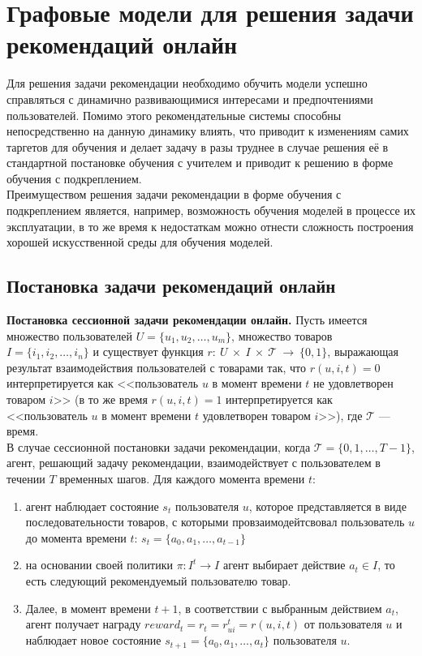 \documentclass[a4paper,14pt,oneside]{mipt-thesis-ms}
\begin{document}
\chapter{Графовые модели для решения задачи рекомендаций онлайн}
Для решения задачи рекомендации необходимо обучить модели успешно справляться с динамично развивающимися интересами и предпочтениями пользователей. Помимо этого рекомендательные системы способны непосредственно на данную динамику влиять, что приводит к изменениям самих таргетов для обучения и делает задачу в разы труднее в случае решения её в стандартной постановке обучения с учителем и приводит к решению в форме обучения с подкреплением.\\

Преимуществом решения задачи рекомендации в форме обучения с подкреплением является, например, возможность обучения моделей в процессе их эксплуатации, в то же время к недостаткам можно отнести сложность построения хорошей искусственной среды для обучения моделей.

\section{Постановка задачи рекомендаций онлайн}
{\bf Постановка сессионной задачи рекомендации онлайн.} Пусть имеется множество пользователей $U = \{u_1, u_2, \dots, u_m\}$, множество товаров $I = \{i_1, i_2, \dots, i_n\}$ и существует функция $r:~U~\times~I~\times~\mathcal{T}~\rightarrow~\{0,  1\}$, выражающая результат взаимодействия пользователей с товарами так, что $r(u, i, t) = 0$ интерпретируется как <<пользователь $u$ в момент времени $t$ не удовлетворен товаром $i$>> (в то же время $r(u, i, t) = 1$ интерпретируется как <<пользователь $u$ в момент времени $t$ удовлетворен товаром $i$>>), где $\mathcal{T}$ --- время\cite{chen03}.\\
В случае сессионной постановки задачи рекомендации\cite{lei01}, когда $\mathcal{T} = \{0, 1, \dots, T - 1\}$, агент, решающий задачу рекомендации, взаимодействует с пользователем в течении $T$ временных шагов. Для каждого момента времени $t$: \\
\begin{enumerate}
\item агент наблюдает состояние $s_t$ пользователя $u$, которое представляется в виде последовательности товаров, с которыми провзаимодейтсвовал пользователь $u$ до момента времени $t$: $s_t = \{a_0, a_1, \dots, a_{t-1}\}$ \\
\item на основании своей политики $\pi: I^t \rightarrow I$ агент выбирает действие $a_t \in I$, то есть следующий рекомендуемый пользователю товар. 
\item Далее, в момент времени $t+1$, в соответствии с выбранным действием $a_t$, агент получает награду ${reward}_t = r_t = r^{t}_{ui} = r(u, i, t)$ от пользователя $u$ и наблюдает новое состояние $s_{t+1} = \{a_0, a_1, \dots, a_{t}\}$ пользователя $u$. 
\end{enumerate}
\end{document}
